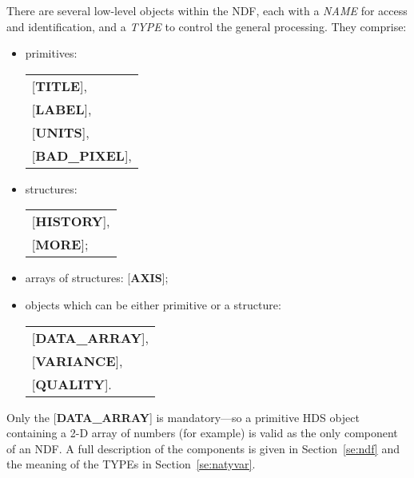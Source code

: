 \documentclass[twoside,11pt]{article}
\newcommand{\htmlref}[2]{#1}
\newcommand{\html}[1]{}
\newcommand{\latex}[1]{#1}
\begin{document}
There are several low-level objects within the NDF, each with a {\it
NAME} for access and identification, and a {\it TYPE} to control the
general processing.  They comprise:
\begin{itemize}
\item primitives: \begin{minipage}[t]{3in}
                  \begin{tabular}{l}
                  {[}{\bf TITLE}{]}, \\
                  {[}{\bf LABEL}{]}, \\
                  {[}{\bf UNITS}{]}, \\
                  {[}{\bf BAD\_PIXEL}{]}, \\
                  \end{tabular}\end{minipage}
\item structures: \begin{minipage}[t]{2in}
                  \begin{tabular}{l}
                  {[}{\bf HISTORY}{]}, \\
                  {[}{\bf MORE}{]}; \\
                  \end{tabular}\end{minipage}
\item arrays of structures: {[}{\bf AXIS}{]};
\item objects which can be either primitive or a structure: \begin{minipage}[t]{2in}
                  \begin{tabular}{l}
                  {[}{\bf DATA\_ARRAY}{]}, \\
                  {[}{\bf VARIANCE}{]}, \\
                  {[}{\bf QUALITY}{]}. \\
                  \end{tabular}\end{minipage}
\end{itemize}

Only the {[}{\bf DATA\_ARRAY}{]} is mandatory---so a primitive HDS
object containing a 2-D array of numbers (for example) is valid as the
only component of an NDF. A full description of the components is
given \latex{in Section~\ref{se:ndf}}\html{\htmlref{here}{se:ndf}} and
the meaning of the TYPEs in \latex{Section~\ref{se:natyvar}.}\html{\htmlref{Naming, Types and
Variants.}{se:natyvar}}
\end{document}
